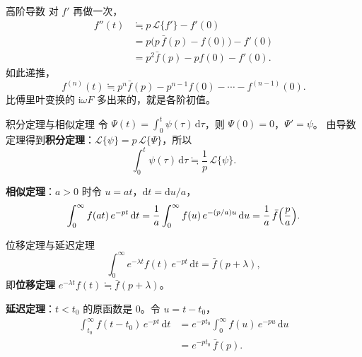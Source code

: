 \documentclass[fontset=windows, chinese, 10pt, xcolor=dvipsnames]{beamer}
\begin{document}
\begin{frame}{高阶导数}
  对 $f'$ 再做一次，
  \begin{align*}
    f''(t)
    &\fallingdotseq p\,\mathcal{L}\{f'\}-f'(0) \\
    &=p\bigl(p\,\bar f(p)-f(0)\bigr)-f'(0) \\
    &=p^2\bar f(p)-p f(0)-f'(0).
  \end{align*}
  如此递推，
  \begin{equation*}
    f^{(n)}(t)
    \fallingdotseq
    p^n\bar f(p)-p^{n-1}f(0)-\cdots-f^{(n-1)}(0).
  \end{equation*}
  比傅里叶变换的 $\mathrm{i}\omega F$ 多出来的，就是各阶初值。
\end{frame}

\begin{frame}{积分定理与相似定理}
  令 $\displaystyle\Psi(t)=\int_0^t\psi(\tau)\,\mathrm{d}\tau$，则 $\Psi(0)=0$，$\Psi'=\psi$。
  由导数定理得到\textbf{积分定理}：$\mathcal{L}\{\psi\}=p\,\mathcal{L}\{\Psi\}$，所以
  \begin{equation*}
    \int_0^t\psi(\tau)\,\mathrm{d}\tau
    \fallingdotseq\frac{1}{p}\,\mathcal{L}\{\psi\}.
  \end{equation*}
  \vspace{0.4em}

  \textbf{相似定理}：$a>0$ 时令 $u=at$，$\mathrm{d}t=\mathrm{d}u/a$，
  \begin{equation*}
    \int_0^{\infty} f(at)\,e^{-pt}\,\mathrm{d}t
    =\frac{1}{a}\int_0^{\infty}
      f(u)\,e^{-(p/a)u}\,\mathrm{d}u
    =\frac{1}{a}\,\bar f\Bigl(\frac{p}{a}\Bigr).
  \end{equation*}
\end{frame}

\begin{frame}{位移定理与延迟定理}
  \begin{equation*}
    \int_0^{\infty} e^{-\lambda t}f(t)\,e^{-pt}\,\mathrm{d}t
    =\bar f(p+\lambda),
  \end{equation*}
  即\textbf{位移定理} $e^{-\lambda t}f(t)\fallingdotseq\bar f(p+\lambda)$。
  \vspace{0.4em}

  \textbf{延迟定理}：$t<t_0$ 的原函数是 $0$。令 $u=t-t_0$，
  \begin{align*}
    \int_{t_0}^{\infty} f(t-t_0)\,e^{-pt}\,\mathrm{d}t
    &=e^{-pt_0}\int_0^{\infty} f(u)\,e^{-pu}\,\mathrm{d}u \\
    &=e^{-pt_0}\,\bar f(p).
  \end{align*}
\end{frame}
\end{document}
